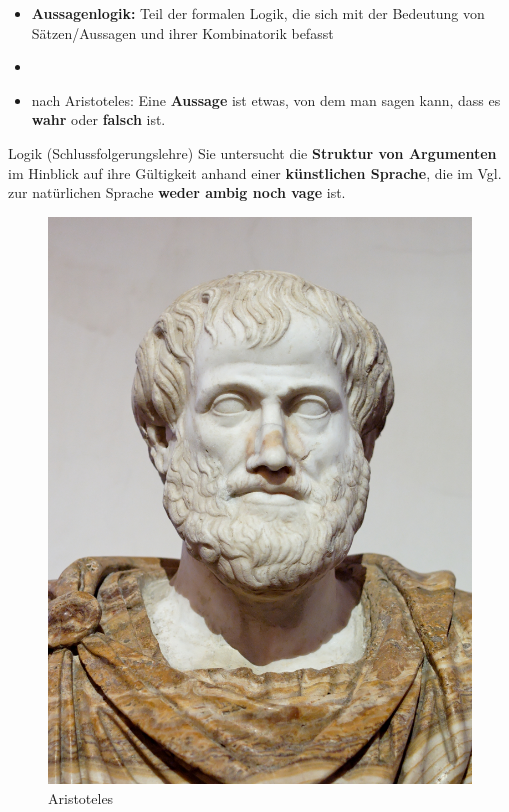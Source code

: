 \begin{frame}
\begin{minipage}{.67\textwidth}
	
	\begin{itemize}
		\item \textbf{Aussagenlogik:} Teil der formalen Logik, die sich mit der Bedeutung von Sätzen/Aussagen und ihrer Kombinatorik befasst
		\item[] 
		\item nach Aristoteles: Eine \textbf{Aussage} ist etwas, von dem man sagen kann, dass es \textbf{wahr} oder \textbf{falsch} ist.
		
	\end{itemize}	
	
	\begin{block}{Logik (Schlussfolgerungslehre)}
		Sie untersucht die \textbf{Struktur von Argumenten} im Hinblick auf ihre Gültigkeit anhand einer \textbf{künstlichen Sprache}, die im Vgl. zur natürlichen Sprache \textbf{weder ambig noch vage} ist.
	\end{block}
	
\end{minipage}
\begin{minipage}{.30\textwidth}
	\begin{figure}
		\begin{center}
			\includegraphics[scale=.45]{material/Aristotle_Altemps}
		\end{center}	
		\caption{Aristoteles}
	\end{figure}
\end{minipage}


\end{frame}
